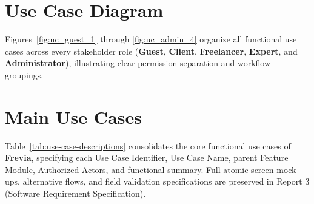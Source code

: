\section{Use Case Diagram}

Figures~\ref{fig:uc_guest_1} through \ref{fig:uc_admin_4} organize all functional use cases across every stakeholder role (\textbf{Guest}, \textbf{Client}, \textbf{Freelancer}, \textbf{Expert}, and \textbf{Administrator}), illustrating clear permission separation and workflow groupings.



\section{Main Use Cases}

Table~\ref{tab:use-case-descriptions} consolidates the core functional use cases of \textbf{Frevia}, specifying each Use Case Identifier, Use Case Name, parent Feature Module, Authorized Actors, and functional summary. Full atomic screen mock-ups, alternative flows, and field validation specifications are preserved in Report 3 (Software Requirement Specification).


